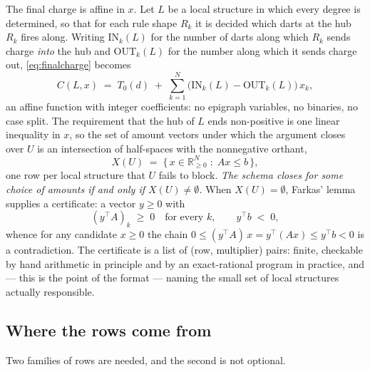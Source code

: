 \documentclass[11pt]{article}
\theoremstyle{definition}
\begin{document}
The final charge is affine in $x$. Let $L$ be a local structure in which every
degree is determined, so that for each rule shape $R_k$ it is decided which darts
at the hub $R_k$ fires along. Writing $\mathrm{IN}_k(L)$ for the number of darts
along which $R_k$ sends charge \emph{into} the hub and $\mathrm{OUT}_k(L)$ for
the number along which it sends charge out, \eqref{eq:finalcharge} becomes
\begin{equation}
\label{eq:leafrow}
  C(L,x) \;=\; T_0(d) \;+\; \sum_{k=1}^{N}\bigl(\mathrm{IN}_k(L) - \mathrm{OUT}_k(L)\bigr)\,x_k ,
\end{equation}
an affine function with integer coefficients: no epigraph variables, no binaries,
no case split. The requirement that the hub of $L$ ends non-positive is one
linear inequality in $x$, so the set of amount vectors under which the argument
closes over $U$ is an intersection of half-spaces with the nonnegative orthant,
\[
  X(U) \;=\; \bigl\{\, x \in \mathbb{R}^N_{\ge0} \;:\; A x \le b \,\bigr\},
\]
one row per local structure that $U$ fails to block. \emph{The schema closes for
some choice of amounts if and only if $X(U) \ne \emptyset$.} When
$X(U) = \emptyset$, Farkas' lemma \cite{farkas1902} supplies a certificate: a
vector $y \ge 0$ with
\begin{equation}
\label{eq:farkas}
  (y^\top\! A)_k \;\ge\; 0 \quad\text{for every } k, \qquad y^\top b \;<\; 0 ,
\end{equation}
whence for any candidate $x \ge 0$ the chain
$0 \le (y^\top\! A)\,x = y^\top(Ax) \le y^\top b < 0$ is a contradiction. The
certificate is a list of (row, multiplier) pairs: finite, checkable by hand
arithmetic in principle and by an exact-rational program in practice, and --- this
is the point of the format --- naming the small set of local structures actually
responsible.

\subsection{Where the rows come from}
\label{sec:rows}

Two families of rows are needed, and the second is not optional.
\end{document}
